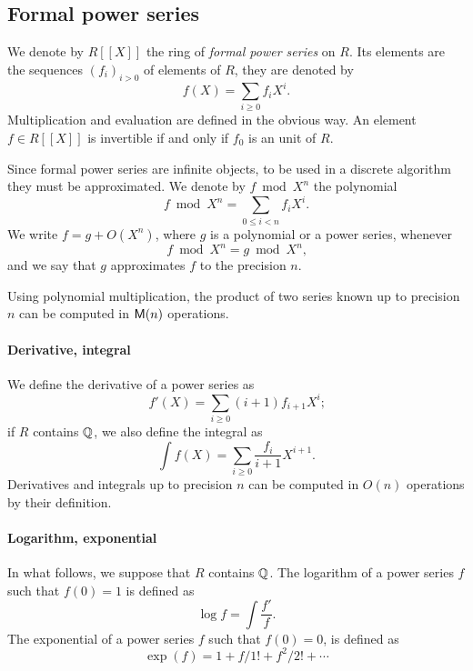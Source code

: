 \subsection{Formal power series}
\label{sec:formal-power-series}
We denote by $R[[X]]$ the ring of
\textit{formal power series} on $R$. Its
elements are the sequences $(f_i)_{i>0}$ of elements of $R$, they are
denoted by
\begin{equation}
  \label{eq:197}
  f(X) = \sum_{i\ge0}f_iX^i
  \text{.}
\end{equation}
Multiplication and evaluation are defined in the obvious way. An
element $f\in R[[X]]$ is invertible if and only if $f_0$ is an unit
of $R$.

Since formal power series are infinite objects, to be used in a
discrete algorithm they must be approximated. We denote by $f\bmod
X^n$ the polynomial
\begin{equation}
  \label{eq:198}
  f\bmod X^n = \sum_{0\le i < n}f_iX^i
  \text{.}
\end{equation}
We write $f = g + O(X^n)$, where $g$ is a polynomial or a power
series, whenever
\[f\bmod X^n=g\bmod X^n\text{,}\] and we say that $g$ approximates $f$
to the precision $n$.

Using polynomial multiplication, the product of two series known up to
precision $n$ can be computed in $\mathsf{M}(n)$ operations.

\paragraph{Derivative, integral}
\label{sec:derivative-integral}
We define the derivative of a
power series as
\begin{equation}
  f'(X) = \sum_{i\ge0}(i+1)f_{i+1}X^i\text{;}
\end{equation}
if $R$ contains $\mathbb{Q}$, we also define the
integral as
\begin{equation}
  \label{eq:200}
  \int f(X) = \sum_{i\ge0}\frac{f_i}{i+1}X^{i+1}\text{.}
\end{equation}
Derivatives and integrals up to precision $n$ can be computed in
$O(n)$ operations by their definition.

\paragraph{Logarithm, exponential}
\label{sec:logarithm}
In what follows, we suppose that $R$ contains $\mathbb{Q}$. The
logarithm of a power series $f$
such that $f(0)=1$ is defined as
\begin{equation}
  \label{eq:194}
  \log f = \int\frac{f'}{f}
  \text{.}
\end{equation}
The exponential of a power
series $f$ such that $f(0)=0$, is defined as
\begin{equation}
  \label{eq:195}
  \exp(f) = 1 + f/1! + f^2/2! + \cdots
\end{equation}

